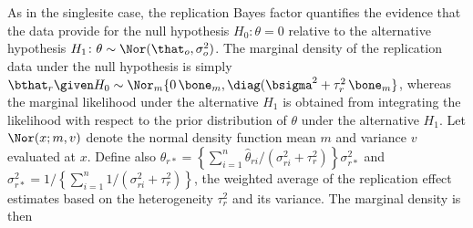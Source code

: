 \begin{subappendices}
As in the singlesite case, the replication Bayes factor quantifies the evidence
that the data provide for the null hypothesis $H_{0}\colon \theta = 0$ relative
to the alternative hypothesis
\mbox{$H_{1} \colon \theta \sim \Nor(\that_{o}, \sigma^{2}_{o})$}. The marginal
density of the replication data under the null hypothesis is simply
$\bthat_{r} \given H_{0} \sim \Nor_{m}\{0 \, \bone_{m}, \diag(\bsigma^{2} + \tau^{2}_{r} \, \bone_{m}\}$,
whereas the marginal likelihood under the alternative $H_{1}$ is obtained from
integrating the likelihood
with respect to the prior distribution of $\theta$ under the alternative
$H_{1}$. %
Let $\Nor(x;m,v)$ denote the normal density function mean $m$ and variance $v$
evaluated at $x$. Define also
$\hat{\theta}_{r*} = \left\{\sum_{i=1}^{n}\hat{\theta}_{ri}/(\sigma^{2}_{ri} + \tau^{2}_{r})\right\} \sigma^{2}_{r*}$
and
$\sigma^{2}_{r*} = 1/\left\{\sum_{i=1}^{n}1/(\sigma^{2}_{ri} + \tau^{2}_{r})\right\}$,
\ie{} the weighted average of the replication effect estimates based on the
heterogeneity $\tau^{2}_{r}$ and its variance. The marginal density is then


\end{subappendices}
